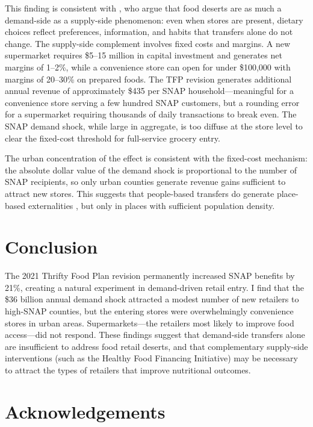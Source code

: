 \documentclass[12pt]{article}
\begin{document}
This finding is consistent with \citet{allcott2019}, who argue that food deserts are as much a demand-side as a supply-side phenomenon: even when stores are present, dietary choices reflect preferences, information, and habits that transfers alone do not change. The supply-side complement involves fixed costs and margins. A new supermarket requires \$5--15 million in capital investment and generates net margins of 1--2\%, while a convenience store can open for under \$100,000 with margins of 20--30\% on prepared foods. The TFP revision generates additional annual revenue of approximately \$435 per SNAP household---meaningful for a convenience store serving a few hundred SNAP customers, but a rounding error for a supermarket requiring thousands of daily transactions to break even. The SNAP demand shock, while large in aggregate, is too diffuse at the store level to clear the fixed-cost threshold for full-service grocery entry.

The urban concentration of the effect is consistent with the fixed-cost mechanism: the absolute dollar value of the demand shock is proportional to the number of SNAP recipients, so only urban counties generate revenue gains sufficient to attract new stores. This suggests that people-based transfers do generate place-based externalities \citep{kline2013}, but only in places with sufficient population density.

\section{Conclusion}

The 2021 Thrifty Food Plan revision permanently increased SNAP benefits by 21\%, creating a natural experiment in demand-driven retail entry. I find that the \$36 billion annual demand shock attracted a modest number of new retailers to high-SNAP counties, but the entering stores were overwhelmingly convenience stores in urban areas. Supermarkets---the retailers most likely to improve food access---did not respond. These findings suggest that demand-side transfers alone are insufficient to address food retail deserts, and that complementary supply-side interventions (such as the Healthy Food Financing Initiative) may be necessary to attract the types of retailers that improve nutritional outcomes.

\section*{Acknowledgements}
\end{document}
